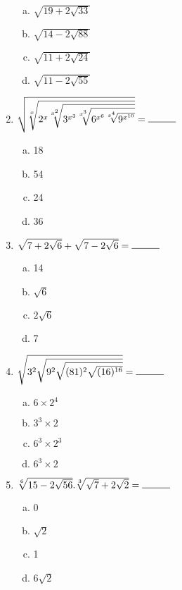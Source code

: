 \begin{multicols}{2}
\begin{enumerate}
\begin{enumerate}[(a)]
\item ${\sqrt{19+2\sqrt{33}}}$
\item ${\sqrt{14-2\sqrt{88}}}$
\item ${\sqrt{11+2\sqrt{24}}}$
\item ${\sqrt{11-2\sqrt{55}}}$
\end{enumerate}
\item $\sqrt{\sqrt[x]{2^{x}\sqrt[x^2]{3^{x^3}\sqrt[x^3]{6^{x^6}\sqrt[x^4]{9^{x^{10}}}}}}} = \rule{1cm}{0.15mm}$
\begin{multicols}{2}
\begin{enumerate}[(a)]
\item 18
\item 54
\item 24
\item 36
\end{enumerate}
\end{multicols}
\item $\sqrt{7+2\sqrt{6}}+\sqrt{7-2\sqrt{6}} = \rule{1cm}{0.15mm}$
\begin{multicols}{2}
\begin{enumerate}[(a)]
\item 14
\item $\sqrt{6}$
\item $2\sqrt{6}$
\item 7
\end{enumerate}
\end{multicols}
\item $\sqrt{3^2\sqrt{9^2\sqrt{(81)^2\sqrt{(16)^{16}}}}} = \rule{1cm}{0.15mm}$
\begin{multicols}{2}
\begin{enumerate}[(a)]
\item $6\times2^4$
\item $3^3\times2$
\item $6^3\times2^3$
\item $6^3\times2$
\end{enumerate}
\end{multicols}
\item $\sqrt[6]{15-2\sqrt{56}}. \sqrt[3]{\sqrt{7}+2\sqrt{2}} = \rule{1cm}{0.15mm}$
\begin{multicols}{2}
\begin{enumerate}[(a)]
\item 0
\item $\sqrt{2}$
\item 1
\item $6\sqrt{2}$
\end{enumerate}

\end{multicols}
\end{enumerate}
\end{multicols}
